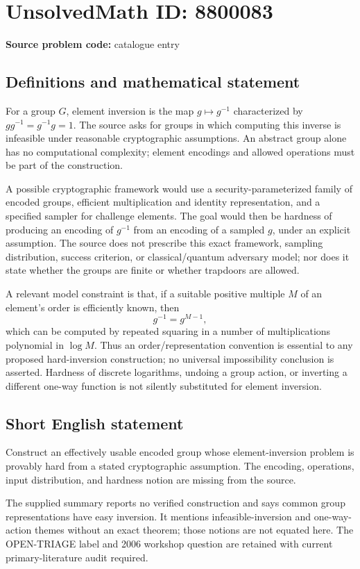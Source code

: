 \documentclass[11pt]{article}
\begin{document}
\section*{UnsolvedMath ID: 8800083}
\textbf{Source problem code:} catalogue entry
\subsection{Definitions and mathematical statement}
For a group $G$, element inversion is the map $g\mapsto g^{-1}$ characterized by $gg^{-1}=g^{-1}g=1$. The source asks for groups in which computing this inverse is infeasible under reasonable cryptographic assumptions. An abstract group alone has no computational complexity; element encodings and allowed operations must be part of the construction.

A possible cryptographic framework would use a security-parameterized family of encoded groups, efficient multiplication and identity representation, and a specified sampler for challenge elements. The goal would then be hardness of producing an encoding of $g^{-1}$ from an encoding of a sampled $g$, under an explicit assumption. The source does not prescribe this exact framework, sampling distribution, success criterion, or classical/quantum adversary model; nor does it state whether the groups are finite or whether trapdoors are allowed.

A relevant model constraint is that, if a suitable positive multiple $M$ of an element's order is efficiently known, then
\[
 g^{-1}=g^{M-1},
\]
which can be computed by repeated squaring in a number of multiplications polynomial in $\log M$. Thus an order/representation convention is essential to any proposed hard-inversion construction; no universal impossibility conclusion is asserted. Hardness of discrete logarithms, undoing a group action, or inverting a different one-way function is not silently substituted for element inversion.
\subsection{Short English statement}
Construct an effectively usable encoded group whose element-inversion problem is provably hard from a stated cryptographic assumption. The encoding, operations, input distribution, and hardness notion are missing from the source.

The supplied summary reports no verified construction and says common group representations have easy inversion. It mentions infeasible-inversion and one-way-action themes without an exact theorem; those notions are not equated here. The OPEN-TRIAGE label and 2006 workshop question are retained with current primary-literature audit required.
\end{document}
